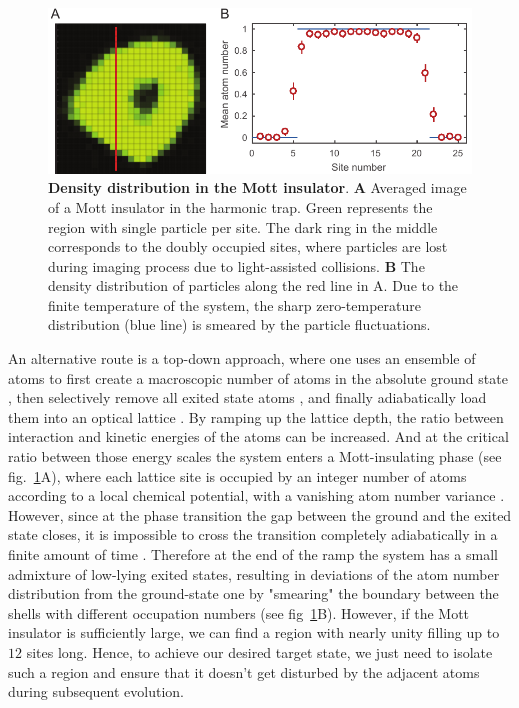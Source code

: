 \begin{figure}[t]
	\centering
	\includegraphics[scale=1]{figures/CTE_MI.pdf}
	\caption{{\bf Density distribution in the Mott insulator}. {\bf A} Averaged image of a Mott insulator in the harmonic trap. Green represents the region with single particle per site. The dark ring in the middle corresponds to the doubly occupied sites, where particles are lost during imaging process due to light-assisted collisions. {\bf B} The density distribution of particles along the red line in A. Due to the finite temperature of the system, the sharp zero-temperature distribution (blue line) is smeared by the particle fluctuations.}
	\label{fig:CTE_MI}
\end{figure}

An alternative route is a top-down approach, where one uses an ensemble of atoms to first create a macroscopic number of atoms in the absolute ground state \cite{Anderson1995, Regal2004}, then selectively remove all exited state atoms \cite{PengThesis}, and finally adiabatically load them into an optical lattice \cite{Greiner2002}. By ramping up the lattice depth, the ratio between interaction and kinetic energies of the atoms can be increased. And at the critical ratio between those energy scales the system enters a Mott-insulating phase (see fig.~\ref{fig:CTE_MI}A), where each lattice site is occupied by an integer number of atoms according to a local chemical potential, with a vanishing atom number variance \cite{Bakr2010, Sherson2010}. However, since at the phase transition the gap between the ground and the exited state closes, it is impossible to cross the transition completely adiabatically in a finite amount of time \cite{Sachdev2011}. Therefore at the end of the ramp the system has a small admixture of low-lying exited states, resulting in  deviations of the atom number distribution from the ground-state one by "smearing" the boundary between the shells with different occupation numbers (see fig~\ref{fig:CTE_MI}B). However, if the Mott insulator is sufficiently large, we can find a region with nearly unity filling up to $12$ sites long. Hence, to achieve our desired target state, we just need to isolate such a region and ensure that it doesn't get disturbed by the adjacent atoms during subsequent evolution.

